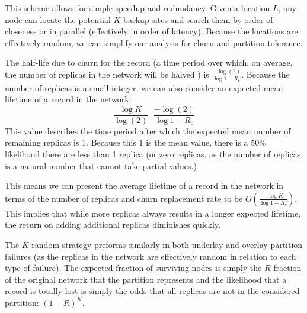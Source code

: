 	This scheme allows for simple speedup and redundancy.
	Given a location $L$, any node can locate the potential $K$ backup sites and search them by order of closeness or in parallel (effectively in order of latency).
	Because the locations are effectively random, we can simplify our analysis for churn and partition tolerance.
	
	The half-life due to churn for the record (a time period over which, on average, the number of replicas in the network will be halved ) is $\frac{-\log(2)}{\log{1-R_{c}}}$.
	Because the number of replicas is a small integer, we can also consider an expected mean lifetime of a record in the network: $$\frac{\log{K}}{\log(2)} \cdot \frac{-\log(2)}{\log{1-R_{c}}}$$ 
	This value describes the time period after which the expected mean number of remaining replicas is 1. 
	Because this 1 is the mean value, there is a 50\% likelihood there are less than 1 replica (or zero replicas, as the number of replicas is a natural number that cannot take partial values.)
	
	This means we can present the average lifetime of a record in the network in terms of the number of replicas and churn replacement rate to be $O(\frac{-\log{K}}{\log{1-R_{c}}})$.
	This implies that while more replicas always results in a longer expected lifetime, the return on adding additional replicas diminishes quickly.
	
	The $K$-random strategy preforms similarly in both underlay and overlay partition failures (as the replicas in the network are effectively random in relation to each type of failure).
	The expected fraction of surviving nodes is simply the $R$ fraction of the original network that the partition represents and the likelihood that a record is totally lost is simply the odds that all replicas are not in the considered partition: $(1-R)^{K}$. 
	
